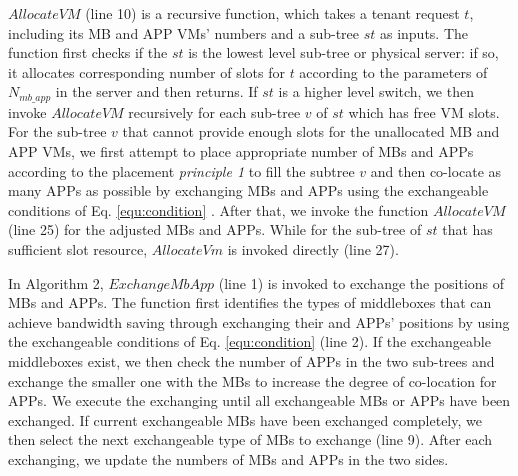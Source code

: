 \documentclass[review]{elsarticle}
\begin{document}
$AllocateVM$ (line 10) is a recursive function, which takes a tenant request $t$, including its MB and APP VMs’ numbers and a sub-tree $st$ as inputs. The function first checks if the $st$ is the lowest level sub-tree or physical server: if so, it allocates corresponding number of slots for $t$ according to the parameters of $N_{mb\_app}$ in the server and then returns. If $st$ is a higher level switch, we then invoke $AllocateVM$ recursively for each sub-tree $v$ of $st$ which has free VM slots. For the sub-tree $v$ that cannot provide enough slots for the unallocated MB and APP VMs, we first attempt to place appropriate number of MBs and APPs according to the placement \emph{principle 1} to fill the subtree $v$ and then co-locate as many APPs as possible by exchanging MBs and APPs using the exchangeable conditions of Eq. \ref{equ:condition} . After that, we invoke the function $AllocateVM$ (line 25) for the adjusted MBs and APPs. While for the sub-tree of $st$ that has sufficient slot resource, $AllocateVm$ is invoked directly (line 27). 

In Algorithm 2, $ExchangeMbApp$ (line 1) is invoked to exchange the positions of MBs and APPs. The function first identifies the types of middleboxes that can achieve bandwidth saving through exchanging their and APPs' positions by using the exchangeable conditions of Eq. \ref{equ:condition} (line 2). If the exchangeable middleboxes exist, we then check the number of APPs in the two sub-trees and exchange the smaller one with the MBs to increase the degree of co-location for APPs. We execute the exchanging until all exchangeable MBs or APPs have been exchanged. If current exchangeable MBs have been exchanged completely, we then select the next exchangeable type of MBs to exchange (line 9). After each exchanging, we update the numbers of MBs and APPs in the two sides.

\end{document}
